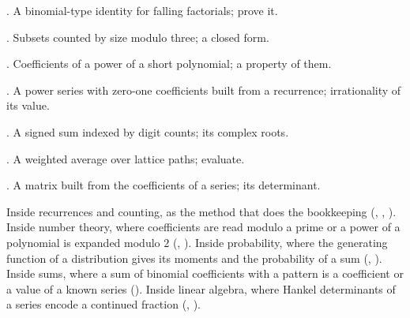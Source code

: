 \begin{ladder}
\item {}. A binomial-type identity for falling factorials; prove it.
\item {}. Subsets counted by size modulo three; a closed form.
\item {}. Coefficients of a power of a short polynomial; a property of them.
\item {}. A power series with zero-one coefficients built from a recurrence; irrationality of its value.
\item {}. A signed sum indexed by digit counts; its complex roots.
\item {}. A weighted average over lattice paths; evaluate.
\item {}. A matrix built from the coefficients of a series; its determinant.
\end{ladder}

\begin{hides}
Inside recurrences and counting, as the method that does the bookkeeping (, , ). Inside number theory, where coefficients are read modulo a prime or a power of a polynomial is expanded modulo $2$ (, ). Inside probability, where the generating function of a distribution gives its moments and the probability of a sum (, ). Inside sums, where a sum of binomial coefficients with a pattern is a coefficient or a value of a known series (). Inside linear algebra, where Hankel determinants of a series encode a continued fraction (, ).
\end{hides}

